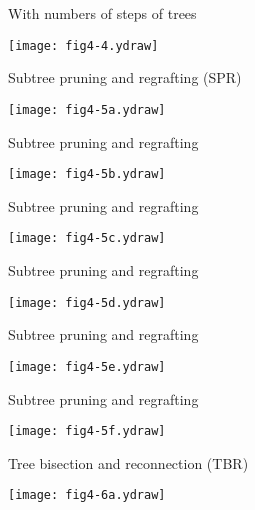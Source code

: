 \documentclass[bluish,slideColor,colorBG,pdf]{prosper}
\begin{document}
\begin{slide}[Replace]{With numbers of steps of trees}

\hspace*{0in}\hspace{-0.1in}\texttt{[image: fig4-4.ydraw]}

\end{slide}

\begin{slide}[Replace]{Subtree pruning and regrafting (SPR) }

\centerline{\texttt{[image: fig4-5a.ydraw]}}

\end{slide}

\begin{slide}[Replace]{Subtree pruning and regrafting }

\centerline{\texttt{[image: fig4-5b.ydraw]}}

\end{slide}

\begin{slide}[Replace]{Subtree pruning and regrafting}

\centerline{\texttt{[image: fig4-5c.ydraw]}}

\end{slide}

\begin{slide}[Replace]{Subtree pruning and regrafting}

\centerline{\texttt{[image: fig4-5d.ydraw]}}

\end{slide}

\begin{slide}[Replace]{Subtree pruning and regrafting}

\centerline{\texttt{[image: fig4-5e.ydraw]}}

\end{slide}

\begin{slide}[Replace]{Subtree pruning and regrafting}

\centerline{\texttt{[image: fig4-5f.ydraw]}}

\end{slide}

\begin{slide}[Replace]{Tree bisection and reconnection (TBR) } 

\centerline{\texttt{[image: fig4-6a.ydraw]}}

\end{slide}
\end{document}
